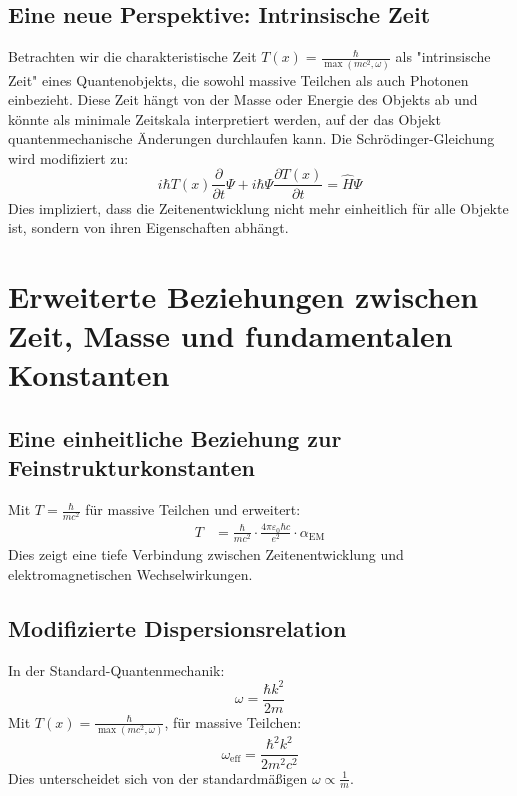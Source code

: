 \documentclass[12pt,a4paper]{article}
\newcommand{\Tfield}{T(x)}
\newcommand{\alphaEM}{\alpha_{\text{EM}}}
\begin{document}
	\subsection{Eine neue Perspektive: Intrinsische Zeit}
	Betrachten wir die charakteristische Zeit \( \Tfield = \frac{\hbar}{\max(m c^2, \omega)} \) als "intrinsische Zeit" eines Quantenobjekts, die sowohl massive Teilchen als auch Photonen einbezieht. Diese Zeit hängt von der Masse oder Energie des Objekts ab und könnte als minimale Zeitskala interpretiert werden, auf der das Objekt quantenmechanische Änderungen durchlaufen kann. Die Schrödinger-Gleichung wird modifiziert zu:
	\begin{equation}
		i\hbar \Tfield \frac{\partial}{\partial t} \Psi + i\hbar \Psi \frac{\partial \Tfield}{\partial t} = \hat{H} \Psi
	\end{equation}
	Dies impliziert, dass die Zeitenentwicklung nicht mehr einheitlich für alle Objekte ist, sondern von ihren Eigenschaften abhängt.
	
	\section{Erweiterte Beziehungen zwischen Zeit, Masse und fundamentalen Konstanten}
	\subsection{Eine einheitliche Beziehung zur Feinstrukturkonstanten}
	Mit \( T = \frac{\hbar}{mc^2} \) für massive Teilchen und erweitert:
	\begin{align}
		T &= \frac{\hbar}{mc^2} \cdot \frac{4\pi\varepsilon_0\hbar c}{e^2} \cdot \alphaEM
	\end{align}
	Dies zeigt eine tiefe Verbindung zwischen Zeitenentwicklung und elektromagnetischen Wechselwirkungen.
	
	\subsection{Modifizierte Dispersionsrelation}
	In der Standard-Quantenmechanik:
	\begin{equation}
		\omega = \frac{\hbar k^2}{2m}
	\end{equation}
	Mit \( \Tfield = \frac{\hbar}{\max(m c^2, \omega)} \), für massive Teilchen:
	\begin{equation}
		\omega_{\text{eff}} = \frac{\hbar^2 k^2}{2 m^2 c^2}
	\end{equation}
	Dies unterscheidet sich von der standardmäßigen \( \omega \propto \frac{1}{m} \).
	
\end{document}
